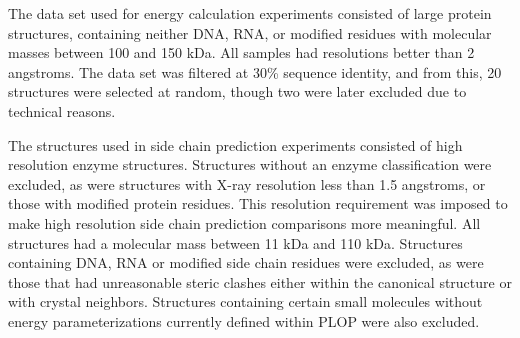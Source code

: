 The data set used for energy calculation experiments consisted of large protein structures, containing neither DNA, RNA, or modified residues with molecular masses between 100 and 150 kDa. 
All samples had resolutions better than 2 angstroms. 
The data set was filtered at 30\% sequence identity, and from this, 20 structures were selected at random, though two were later excluded due to technical reasons.

The structures used in side chain prediction experiments consisted of high resolution enzyme structures.
Structures without an enzyme classification were excluded, as were structures with X-ray resolution less than 1.5 angstroms, or those with modified protein residues.
This resolution requirement was imposed to make high resolution side chain prediction comparisons more meaningful.
All structures had a molecular mass between 11 kDa and 110 kDa.
Structures containing DNA, RNA or modified side chain residues were excluded, as were those that had unreasonable steric clashes either within the canonical structure or with crystal neighbors.
Structures containing certain small molecules without energy parameterizations currently defined within PLOP were also excluded.
